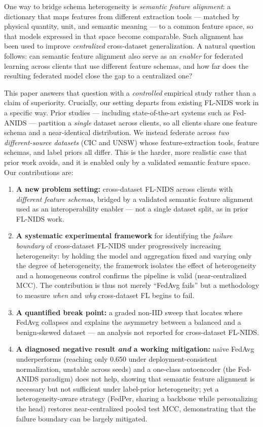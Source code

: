 \documentclass[11pt,a4paper]{article}
\begin{document}
One way to bridge schema heterogeneity is \emph{semantic feature alignment}: a
dictionary that maps features from different extraction tools --- matched by
physical quantity, unit, and semantic meaning --- to a common feature space, so
that models expressed in that space become comparable. Such alignment has been used to improve \emph{centralized}
cross-dataset generalization. A natural question follows: can semantic feature
alignment also serve as an \emph{enabler} for federated learning across clients
that use different feature schemas, and how far does the resulting federated model
close the gap to a centralized one?

This paper answers that question with a \emph{controlled} empirical study rather
than a claim of superiority. Crucially, our setting departs from existing FL-NIDS
work in a specific way. Prior studies --- including state-of-the-art systems such
as Fed-ANIDS \cite{fedanids} --- partition a \emph{single} dataset across clients,
so all clients share one feature schema and a near-identical distribution. We
instead federate across \emph{two different-source datasets} (CIC and UNSW) whose
feature-extraction tools, feature schemas, and label priors all differ. This is
the harder, more realistic case that prior work avoids, and it is enabled only by
a validated semantic feature space. Our contributions are:
\begin{enumerate}[leftmargin=1.6em]
  \item \textbf{A new problem setting:} cross-dataset FL-NIDS across clients with
  \emph{different feature schemas}, bridged by a validated semantic feature
  alignment used as an interoperability enabler --- not a single dataset split, as
  in prior FL-NIDS work.
  \item \textbf{A systematic experimental framework} for identifying the
  \emph{failure boundary} of cross-dataset FL-NIDS under progressively increasing
  heterogeneity: by holding the model and aggregation fixed and varying only the
  degree of heterogeneity, the framework isolates the effect of heterogeneity and
  a homogeneous control confirms the pipeline is valid (near-centralized MCC). The
  contribution is thus not merely ``FedAvg fails'' but a methodology to measure
  \emph{when} and \emph{why} cross-dataset FL begins to fail.
  \item \textbf{A quantified break point:} a graded non-IID sweep that locates
  where FedAvg collapses and explains the asymmetry between a balanced and a
  benign-skewed dataset --- an analysis not reported for cross-dataset FL-NIDS.
  \item \textbf{A diagnosed negative result \emph{and} a working mitigation:} naive
  FedAvg underperforms (reaching only 0.650 under deployment-consistent
  normalization, unstable across seeds) and a one-class autoencoder (the Fed-ANIDS
  paradigm) does not help, showing that semantic feature alignment is necessary but not
  sufficient under label-prior heterogeneity; yet a heterogeneity-aware strategy
  (FedPer, sharing a backbone while personalizing the head) restores
  near-centralized pooled test MCC, demonstrating that the failure boundary can be
  largely mitigated.
\end{enumerate}
\end{document}
